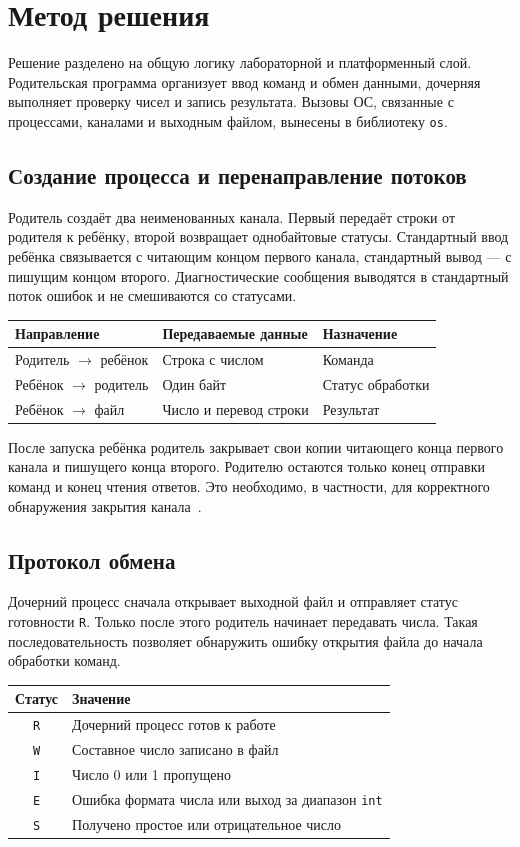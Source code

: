 \section{Метод решения}
Решение разделено на общую логику лабораторной и платформенный слой. Родительская программа организует ввод команд и обмен данными, дочерняя выполняет проверку чисел и запись результата. Вызовы ОС, связанные с процессами, каналами и выходным файлом, вынесены в библиотеку \texttt{os}.

\subsection{Создание процесса и перенаправление потоков}
Родитель создаёт два неименованных канала. Первый передаёт строки от родителя к ребёнку, второй возвращает однобайтовые статусы. Стандартный ввод ребёнка связывается с читающим концом первого канала, стандартный вывод --- с пишущим концом второго. Диагностические сообщения выводятся в стандартный поток ошибок и не смешиваются со статусами.

\begin{center}
\begin{tabular}{lll}
Направление & Передаваемые данные & Назначение \\
\hline
Родитель $\rightarrow$ ребёнок & Строка с числом & Команда \\
Ребёнок $\rightarrow$ родитель & Один байт & Статус обработки \\
Ребёнок $\rightarrow$ файл & Число и перевод строки & Результат \\
\end{tabular}
\end{center}

После запуска ребёнка родитель закрывает свои копии читающего конца первого канала и пишущего конца второго. Родителю остаются только конец отправки команд и конец чтения ответов. Это необходимо, в частности, для корректного обнаружения закрытия канала~\cite{winpipes,linuxpipes}.

\subsection{Протокол обмена}
Дочерний процесс сначала открывает выходной файл и отправляет статус готовности \texttt{R}. Только после этого родитель начинает передавать числа. Такая последовательность позволяет обнаружить ошибку открытия файла до начала обработки команд.

\begin{center}
\begin{tabular}{cl}
Статус & Значение \\
\hline
\texttt{R} & Дочерний процесс готов к работе \\
\texttt{W} & Составное число записано в файл \\
\texttt{I} & Число 0 или 1 пропущено \\
\texttt{E} & Ошибка формата числа или выход за диапазон \texttt{int} \\
\texttt{S} & Получено простое или отрицательное число \\
\end{tabular}
\end{center}

